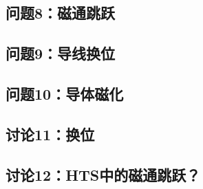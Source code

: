 \newpage
\subsection{问题8：磁通跳跃}

\newpage
\subsection{问题9：导线换位}

\newpage
\subsection{问题10：导体磁化}

\newpage
\subsection{讨论11：换位}

\newpage
\subsection{讨论12：HTS中的磁通跳跃？}